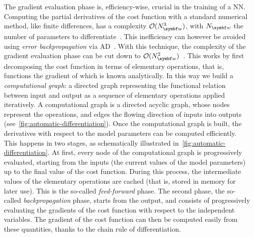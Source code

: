 The gradient evaluation phase is, efficiency-wise, crucial in the training of a NN.
Computing the partial derivatives of the cost function with a standard numerical method, like finite differences, has a complexity $\mathcal O(N_{\bs w}^3)$, with $N_{\bs w}$ the number of parameters to differentiate~\cite{bishop2006pattern}.
This inefficiency can however be avoided using \emph{error backpropagation} via \acf{AD}~\cite{baydin2018automatic,bartholomewbiggs2000automatic,wengert1964a,bischof2008advances}.
With this technique, the complexity of the gradient evaluation phase can be cut down to $\mathcal O(N_{\bs w}^2)$~\cite{bishop2006pattern}.
This works by first decomposing the cost function in terms of elementary operations, that is, functions the gradient of which is known analytically.
In this way we build a \emph{computational graph}: a directed graph representing the functional relation between input and output as a sequence of elementary operations applied iteratively.
A computational graph is a directed acyclic graph, whose nodes represent the operations, and edges the flowing direction of inputs into outputs (see~\cref{fig:automatic-differentiation}).
Once the computational graph is built, the derivatives with respect to the model parameters can be computed efficiently.
This happens in two stages, as schematically illustrated in~\cref{fig:automatic-differentiation}.
At first, every node of the computational graph is progressively evaluated, starting from the inputs (the current values of the model parameters) up to the final value of the cost function.
During this process, the intermediate values of the elementary operations are cached (that is, stored in memory for later use).
This is the so-called \emph{feed-forward} phase.
The second phase, the so-called \emph{backpropagation} phase, starts from the output, and consists of progressively evaluating the gradients of the cost function with respect to the independent variables.
The gradient of the cost function can then be computed easily from these quantities, thanks to the chain rule of differentiation.

